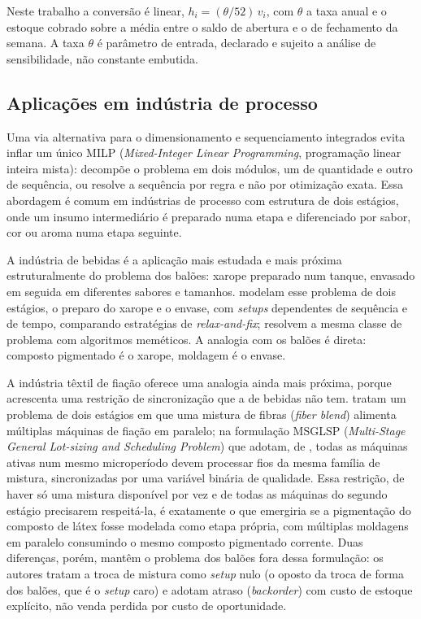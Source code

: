 \documentclass[fleqn,12pt,a4paper]{article}
\begin{document}
Neste trabalho a conversão é linear, $h_i = (\theta/52)\,v_i$, com $\theta$ a taxa anual e o estoque cobrado sobre a média entre o saldo de abertura e o de fechamento da semana. A taxa $\theta$ é parâmetro de entrada, declarado e sujeito a análise de sensibilidade, não constante embutida.

\subsection{Aplicações em indústria de processo}

Uma via alternativa para o dimensionamento e sequenciamento integrados evita inflar um único MILP (\textit{Mixed-Integer Linear Programming}, programação linear inteira mista): decompõe o problema em dois módulos, um de quantidade e outro de sequência, ou resolve a sequência por regra e não por otimização exata. Essa abordagem é comum em indústrias de processo com estrutura de dois estágios, onde um insumo intermediário é preparado numa etapa e diferenciado por sabor, cor ou aroma numa etapa seguinte.

A indústria de bebidas é a aplicação mais estudada e mais próxima estruturalmente do problema dos balões: xarope preparado num tanque, envasado em seguida em diferentes sabores e tamanhos.  modelam esse problema de dois estágios, o preparo do xarope e o envase, com \textit{setups} dependentes de sequência e de tempo, comparando estratégias de \textit{relax-and-fix};  resolvem a mesma classe de problema com algoritmos meméticos. A analogia com os balões é direta: composto pigmentado é o xarope, moldagem é o envase.

A indústria têxtil de fiação oferece uma analogia ainda mais próxima, porque acrescenta uma restrição de sincronização que a de bebidas não tem.  tratam um problema de dois estágios em que uma mistura de fibras (\textit{fiber blend}) alimenta múltiplas máquinas de fiação em paralelo; na formulação MSGLSP (\textit{Multi-Stage General Lot-sizing and Scheduling Problem}) que adotam, de , todas as máquinas ativas num mesmo microperíodo devem processar fios da mesma família de mistura, sincronizadas por uma variável binária de qualidade. Essa restrição, de haver só uma mistura disponível por vez e de todas as máquinas do segundo estágio precisarem respeitá-la, é exatamente o que emergiria se a pigmentação do composto de látex fosse modelada como etapa própria, com múltiplas moldagens em paralelo consumindo o mesmo composto pigmentado corrente. Duas diferenças, porém, mantêm o problema dos balões fora dessa formulação: os autores tratam a troca de mistura como \textit{setup} nulo (o oposto da troca de forma dos balões, que é o \textit{setup} caro) e adotam atraso (\textit{backorder}) com custo de estoque explícito, não venda perdida por custo de oportunidade.
\end{document}
